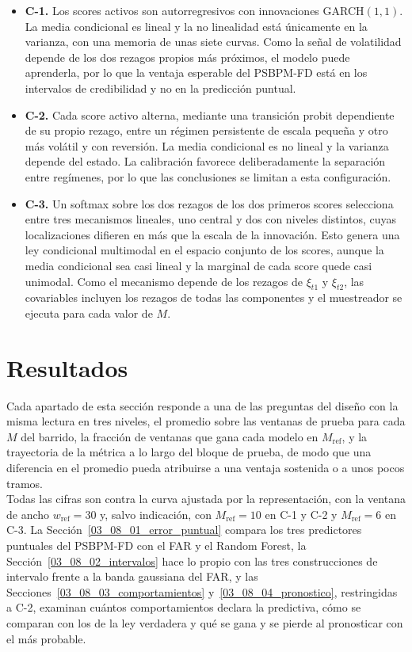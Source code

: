 \begin{itemize}
    \item \textbf{C-1.} Los scores activos son autorregresivos con innovaciones GARCH$(1,1)$. La media condicional es lineal y la no linealidad está únicamente en la varianza, con una memoria de unas siete curvas. Como la señal de volatilidad depende de los dos rezagos propios más próximos, el modelo puede aprenderla, por lo que la ventaja esperable del PSBPM-FD está en los intervalos de credibilidad y no en la predicción puntual.

    \item \textbf{C-2.} Cada score activo alterna, mediante una transición probit dependiente de su propio rezago, entre un régimen persistente de escala pequeña y otro más volátil y con reversión. La media condicional es no lineal y la varianza depende del estado. La calibración favorece deliberadamente la separación entre regímenes, por lo que las conclusiones se limitan a esta configuración.

       \item \textbf{C-3.} Un softmax sobre los dos rezagos de los dos primeros scores selecciona entre tres mecanismos lineales, uno central y dos con niveles distintos, cuyas localizaciones difieren en más que la escala de la innovación. Esto genera una ley condicional multimodal en el espacio conjunto de los scores, aunque la media condicional sea casi lineal y la marginal de cada score quede casi unimodal. Como el mecanismo depende de los rezagos de $\xi_{t1}$ y $\xi_{t2}$, las covariables incluyen los rezagos de todas las componentes y el muestreador se ejecuta para cada valor de $M$.
\end{itemize}


\section{Resultados}
\label{03_08_00_resultados}

Cada apartado de esta sección responde a una de las preguntas del diseño con la misma lectura en tres niveles, el promedio sobre las ventanas de prueba para cada $M$ del barrido, la fracción de ventanas que gana cada modelo en $M_{\mathrm{ref}}$, y la trayectoria de la métrica a lo largo del bloque de prueba, de modo que una diferencia en el promedio pueda atribuirse a una ventaja sostenida o a unos pocos tramos.\\

Todas las cifras son contra la curva ajustada por la representación, con la ventana de ancho $w_{\mathrm{ref}} = 30$ y, salvo indicación, con $M_{\mathrm{ref}} = 10$ en C-1 y C-2 y $M_{\mathrm{ref}} = 6$ en C-3. La Sección~\ref{03_08_01_error_puntual} compara los tres predictores puntuales del PSBPM-FD con el FAR y el Random Forest, la Sección~\ref{03_08_02_intervalos} hace lo propio con las tres construcciones de intervalo frente a la banda gaussiana del FAR, y las Secciones~\ref{03_08_03_comportamientos} y~\ref{03_08_04_pronostico}, restringidas a C-2, examinan cuántos comportamientos declara la predictiva, cómo se comparan con los de la ley verdadera y qué se gana y se pierde al pronosticar con el más probable.


